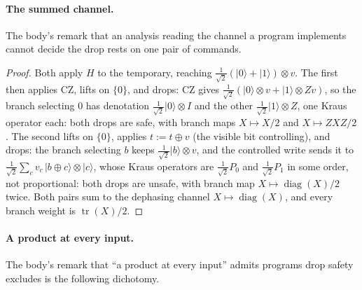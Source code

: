 \documentclass[acmsmall,screen,review,anonymous,nonacm]{acmart}
\begin{document}
\paragraph{The summed channel.} The body's remark that an analysis reading
the channel a program implements cannot decide the drop rests on one pair of
commands.

\stmtChannel
\begin{proof}
Both apply $H$ to the temporary, reaching $\tfrac1{\sqrt2}(|0\rangle +
|1\rangle) \otimes v$. The first then applies $\mathrm{CZ}$, lifts on $\{0\}$,
and drops: $\mathrm{CZ}$ gives $\tfrac1{\sqrt2}(|0\rangle \otimes v + |1\rangle
\otimes Zv)$, so the branch selecting $0$ has denotation $\tfrac1{\sqrt2}
|0\rangle \otimes I$ and the other $\tfrac1{\sqrt2} |1\rangle \otimes Z$, one
Kraus operator each: both drops are safe, with branch maps $X \mapsto X/2$
and $X \mapsto ZXZ/2$. The second lifts on $\{0\}$, applies $t := t \oplus v$
(the visible bit controlling), and drops: the branch selecting $b$ keeps
$\tfrac1{\sqrt2}|b\rangle \otimes v$, and the controlled write sends it to
$\tfrac1{\sqrt2} \sum_c v_c\, |b \oplus c\rangle \otimes |c\rangle$, whose
Kraus operators are $\tfrac1{\sqrt2} P_0$ and $\tfrac1{\sqrt2} P_1$ in some
order, not proportional: both drops are unsafe, with branch map $X \mapsto
\operatorname{diag}(X)/2$ twice. Both pairs sum to the dephasing channel $X
\mapsto \operatorname{diag}(X)$, and every branch weight is
$\operatorname{tr}(X)/2$.
\end{proof}

\paragraph{A product at every input.} The body's remark that ``a product
at every input'' admits programs drop safety excludes is the following
dichotomy.
\end{document}
